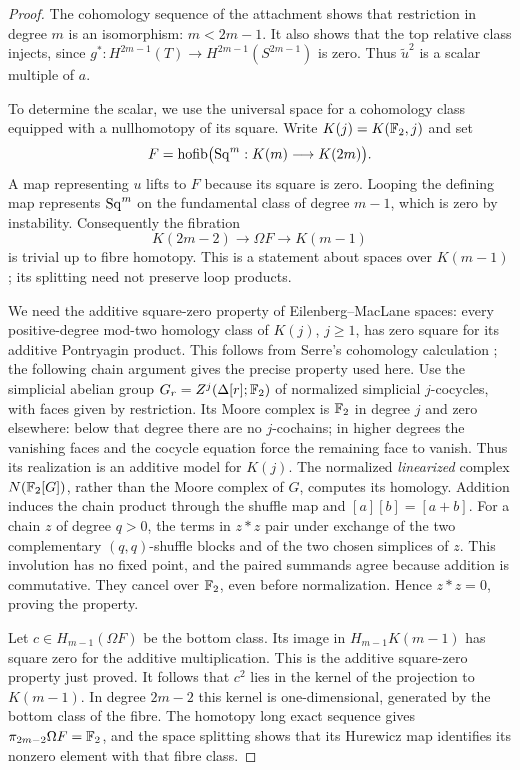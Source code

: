 \begin{proof}
The cohomology sequence of the attachment shows that restriction in
degree \(m\) is an isomorphism: \(m<2m-1\). It also shows that the
top relative class injects, since \(g^*:H^{2m-1}(T)\to H^{2m-1}(S^{2m-1})\)
is zero. Thus \(\widetilde u^2\) is a scalar multiple of \(a\).

To determine the scalar, we use the universal space for a cohomology
class equipped with a nullhomotopy of its square. Write
\(K(j)=K(\mathbb F_2,j)\) and set
\[
F=\operatorname{hofib}\bigl(\operatorname{Sq}^m:K(m)\longrightarrow K(2m)\bigr).
\]
A map representing \(u\) lifts to \(F\) because its square is zero.
Looping the defining map represents \(\operatorname{Sq}^m\) on the fundamental class
of degree \(m-1\), which is zero by instability. Consequently the
fibration
\[
K(2m-2)\longrightarrow\Omega F\longrightarrow K(m-1)
\]
is trivial up to fibre homotopy. This is a statement about spaces over
\(K(m-1)\); its splitting need not preserve loop products.

We need the additive square-zero property of Eilenberg--MacLane spaces:
every positive-degree mod-two homology class of \(K(j)\), \(j\ge1\),
has zero square for its additive Pontryagin product. This follows from
Serre's cohomology calculation \cite{Serre1953}; the following chain
argument gives the precise property used here. Use the simplicial
abelian group \(G_r=Z^j(\Delta[r];\mathbb F_2)\) of normalized simplicial
\(j\)-cocycles, with faces given by restriction. Its Moore complex is
\(\mathbb F_2\) in degree \(j\) and zero elsewhere: below that degree there
are no \(j\)-cochains; in higher degrees the vanishing faces and the
cocycle equation force the remaining face to vanish. Thus its realization
is an additive model for \(K(j)\). The normalized \emph{linearized}
complex \(N(\mathbb F_2[G])\), rather than the Moore complex of \(G\),
computes its homology. Addition induces the chain product through the
shuffle map and \([a][b]=[a+b]\). For a chain \(z\) of degree \(q>0\),
the terms in \(z*z\) pair under exchange of the two complementary
\((q,q)\)-shuffle blocks and of the two chosen simplices of \(z\).
This involution has no fixed point, and the paired summands agree because
addition is commutative. They cancel over \(\mathbb F_2\), even before
normalization. Hence \(z*z=0\), proving the property.

Let \(c\in H_{m-1}(\Omega F)\) be the bottom class. Its image in
\(H_{m-1}K(m-1)\) has square zero for the additive multiplication.
This is the additive square-zero property just proved. It follows that
\(c^2\) lies in
the kernel of the projection to \(K(m-1)\). In degree \(2m-2\) this
kernel is one-dimensional, generated by the bottom class of the fibre.
The homotopy long exact sequence gives
\(\pi_{2m-2}\Omega F=\mathbb F_2\), and the space splitting shows that its
Hurewicz map identifies its nonzero element with that fibre class.


\end{proof}
